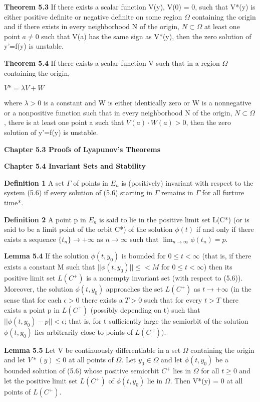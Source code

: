 \documentclass{article}
\begin{document}
\textbf {Theorem 5.3} If there exists a scalar function V(y), V(0) = 0, such that V*(y) is either positive definite or negative definite on some region $\Omega$ containing the origin and if there exists in every neighborhood N of the origin, $N \subset \Omega$ at least one point $a \neq 0$ such that V(a) has the same sign as V*(y), then the zero solution of y'=f(y) is unstable.

\textbf {Theorem 5.4} If there exists a scalar function V such that in a region $\Omega$ containing the origin, 
\begin{center}
$V* = \lambda V + W$
\end{center}
where $\lambda > 0$ is a constant and W is either identically zero or W is a nonnegative or a nonpositive function such that in every neighborhood N of the origin, $N \subset \Omega$, there is at least one point a such that $V(a) \cdot W(a) > 0$, then the zero solution of y'=f(y) is unstable.

\textbf {Chapter 5.3 Proofs of Lyapunov's Theorems}

\textbf {Chapter 5.4 Invariant Sets and Stability}

\textbf {Definition 1} A set $\Gamma$ of points in $E_n$ is (positively) invariant with respect to the system (5.6) if every solution of (5.6) starting in $\Gamma$ remains in $\Gamma$ for all furture time*.

\textbf {Definition 2} A point p in $E_n$ is said to lie in the positive limit set L(C*) (or is said to be a limit point of the orbit C*) of the solution $\phi(t)$ if and only if there exists a sequence $\{t_n\} \to + \infty$ as $n \to \infty$ such that $\lim_{n \to \infty} \phi(t_n) = p$.

\textbf {Lemma 5.4} If the solution $\phi(t,y_0)$ is bounded for $0 \leq t < \infty$ (that is, if there exists a constant M such that $||\phi(t, y_0)|| \leq < M$ for $0 \leq t < \infty$) then its positive limit set $L(C^+)$ is a nonempty invariant set (with respect to (5.6)). Moreover, the solution $\phi(t,y_0)$ approaches the set $L(C^+)$ as $t \to + \infty$ (in the sense that for each $\epsilon > 0$ there exists a $T > 0$ such that for every $t > T$ there exists a point p in $L(C^+)$ (possibly depending on t) such that $||\phi(t,y_0) - p|| < \epsilon$; that is, for t sufficiently large the semiorbit of the solution $\phi(t,y_0)$ lies arbitrarily close to points of $L(C^+))$.

\textbf {Lemma 5.5} Let V be continuously differentiable in a set $\Omega$ containing the origin and let $V*(y) \leq 0$ at all points of $\Omega$. Let $y_0 \in \Omega$ and let $\phi(t, y_0)$ be a bounded solution of (5.6) whose positive semiorbit $C^+$ lies in $\Omega$ for all $t \geq 0$ and let the positive limit set $L(C^+)$ of $\phi(t, y_0)$ lie in $\Omega$. Then V*(y) = 0 at all points of $L(C^+)$.
\end{document}
